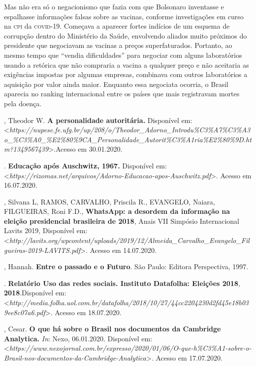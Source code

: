 Mas não era só o negacionismo que fazia com que Bolsonaro inventasse e
espalhasse informações falsas sobre as vacinas, conforme investigações
em curso na \textsc{cpi} da \textsc{covid-19}. Começava a aparecer fortes indícios de
um esquema de corrupção dentro do Ministério da Saúde, envolvendo aliados
muito próximos do presidente que negociavam as vacinas a preços
superfaturados. Portanto, ao mesmo tempo que ``vendia dificuldades''
para negociar com alguns laboratórios usando a retórica que não
compraria a vacina a qualquer preço e não aceitaria as exigências
impostas por algumas empresas, combinava com outros laboratórios a
aquisição por valor ainda maior. Enquanto essa negociata ocorria, o
Brasil aparecia no ranking internacional entre os países que mais
registravam mortes pela doença.

\begin{bibliohedra}
, Theodor W. \textbf{A personalidade autoritária.} Disponível em:
\textless{}\textit{https://nupese.fe.ufg.br/up/208/o/Theodor\_Adorno\_Introdu\%C3\%A7\%C3\%A3o\_\%C3\%A0\_\%E2\%80\%9CA\_Personalidade\_Autorit\%C3\%A1ria\%E2\%80\%9D.htm?1349567439}\textgreater{}.Acesso
em 30.01.2020.

\titidem. \textbf{Educação após Auschwitz,
1967.} Disponível em:
\textless{}\textit{https://rizomas.net/arquivos/Adorno-Educacao-apos-Auschwitz.pdf}\textgreater{}.
Acesso em 16.07.2020.

, Silvana L, RAMOS, CARVALHO, Priscila R., EVANGELO, Naiara,
FILGUEIRAS, Roni F.D., \textbf{WhatsApp: a desordem da informação na
eleição presidencial brasileira de 2018}, Anais VII Simpósio
Internacional Lavits 2019, Disponível em:
\textless{}\textit{http://lavits.org/wpcontent/uploads/2019/12/Almeida\_Carvalho\_Evangelo\_Filgueiras-2019-LAVITS.pdf}\textgreater{}.
Acesso em 14.07.2020.

, Hannah. \textbf{Entre o passado e o Futuro}. São Paulo: Editora
Perspectiva, 1997.

. \textbf{Relatório Uso das redes sociais. Instituto
Datafolha: Eleições 2018}, \textbf{2018}.Disponível em:
\textless{}\textit{http://media.folha.uol.com.br/datafolha/2018/10/27/44cc2204230d2fd45e18b039ee8c07a6.pdf}\textgreater{}.
Acesso em 18.07.2020.

, Cesar. \textbf{O que há sobre o Brasil nos documentos da
Cambridge Analytica.} \textit{In}: Nexo, 06.01.2020. Disponível em:
\textless{}\textit{https://www.nexojornal.com.br/expresso/2020/01/06/O-que-h\%C3\%A1-sobre-o-Brasil-nos-documentos-da-Cambridge-Analytica}\textgreater{}.
Acesso em 17.07.2020.


\end{bibliohedra}
